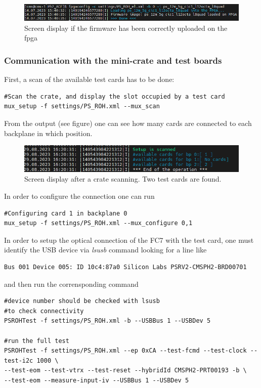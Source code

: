 \documentclass[10pt,a4paper]{article}
\begin{document}
\begin{figure}[h!]
\centering
 \includegraphics[width=\linewidth]{firmware-writing.png} 
  \caption{Screen display if the firmware has been correctly uploaded on the fpga}
\end{figure}

\subsubsection{Communication with the mini-crate and test boards}
First, a scan of the available test cards has to be done:
\begin{framed}
\begin{verbatim}
#Scan the crate, and display the slot occupied by a test card
mux_setup -f settings/PS_ROH.xml --mux_scan
\end{verbatim}
\end{framed}
From the output (see figure) one can see how many cards are connected to each backplane in which position.
\begin{figure}[h!]
\centering
 \includegraphics[width=\linewidth]{mux_scan.png} 
  \caption{Screen display after a crate scanning. Two test cards are found.}
\end{figure}
In order to configure the connection one can run 
\begin{framed}
\begin{verbatim}
#Configuring card 1 in backplane 0
mux_setup -f settings/PS_ROH.xml --mux_configure 0,1
\end{verbatim}
\end{framed}
In order to setup the optical connection of the FC7 with the test card, one must identify the USB device via {\it lsusb} command looking for a line like
\begin{framed}
\begin{verbatim}
Bus 001 Device 005: ID 10c4:87a0 Silicon Labs PSRV2-CMSPH2-BRD00701 
\end{verbatim}
\end{framed}
and then run the corrensponding command
\begin{framed}
\begin{verbatim}
#device number should be checked with lsusb
#to check connectivity
PSROHTest -f settings/PS_ROH.xml -b --USBBus 1 --USBDev 5 

#run the full test
PSROHTest -f settings/PS_ROH.xml --ep 0xCA --test-fcmd --test-clock --test-i2c 1000 \
--test-eom --test-vtrx --test-reset --hybridId CMSPH2-PRT00193 -b \
--test-eom --measure-input-iv --USBBus 1 --USBDev 5
\end{verbatim}
\end{framed}
\end{document}

